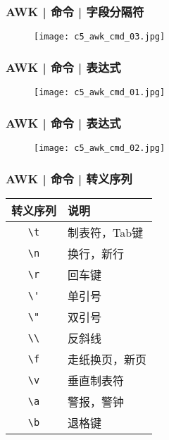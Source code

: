 \begin{frame}
  \frametitle{AWK | 命令 | 字段分隔符}
  \begin{figure}
    \centering
    \texttt{[image: c5\_awk\_cmd\_03.jpg]}
  \end{figure}
\end{frame}

\begin{frame}
  \frametitle{AWK | 命令 | 表达式}
  \begin{figure}
    \centering
    \texttt{[image: c5\_awk\_cmd\_01.jpg]}
  \end{figure}
\end{frame}

\begin{frame}
  \frametitle{AWK | 命令 | 表达式}
  \begin{figure}
    \centering
    \texttt{[image: c5\_awk\_cmd\_02.jpg]}
  \end{figure}
\end{frame}

\begin{frame}[fragile]
  \frametitle{AWK | 命令 | \alert{转义序列}}
  \begin{table}
    \centering
    \begin{tabularx}{0.8\textwidth}{cX}
      \hline
      \rowcolor{blue!50}转义序列 & 说明\\
      \hline
      \verb|\t| & 制表符，Tab键\\
      \verb|\n| & 换行，新行\\
      \verb|\r| & 回车键\\
      \verb|\'| & 单引号\\
      \verb|\"| & 双引号\\
      \verb|\\| & 反斜线\\
      \verb|\f| & 走纸换页，新页\\
      \verb|\v| & 垂直制表符\\
      \verb|\a| & 警报，警钟\\
      \verb|\b| & 退格键\\
      \hline
    \end{tabularx}
  \end{table}
\end{frame}


